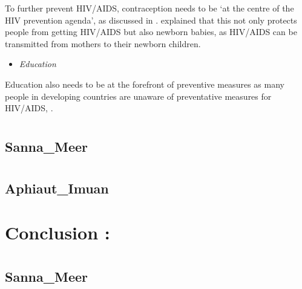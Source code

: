 \documentclass[11pt,a4paper,]{article}
\providecommand{\tightlist}{%
  \setlength{\itemsep}{0pt}\setlength{\parskip}{0pt}}
\begin{document}
To further prevent HIV/AIDS, contraception needs to be `at the centre of the HIV prevention agenda', as discussed in \textcite{crankshaw2016placing}. \textcite{newell1998mechanisms} explained that this not only protects people from getting HIV/AIDS but also newborn babies, as HIV/AIDS can be transmitted from mothers to their newborn children.

\begin{itemize}
\tightlist
\item
  \emph{Education}
\end{itemize}

Education also needs to be at the forefront of preventive measures as many people in developing countries are unaware of preventative measures for HIV/AIDS, \textcite{baxen2004researching}.

\section*{}

\hypertarget{sanna_meer}{%
\subsection{Sanna\_Meer}\label{sanna_meer}}

\section*{}

\hypertarget{aphiaut_imuan}{%
\subsection{Aphiaut\_Imuan}\label{aphiaut_imuan}}

\clearpage

\hypertarget{conclusion}{%
\section{Conclusion :}\label{conclusion}}

\clearpage

\clearpage

\section*{}

\hypertarget{sanna_meer-1}{%
\subsection{Sanna\_Meer}\label{sanna_meer-1}}
\end{document}
